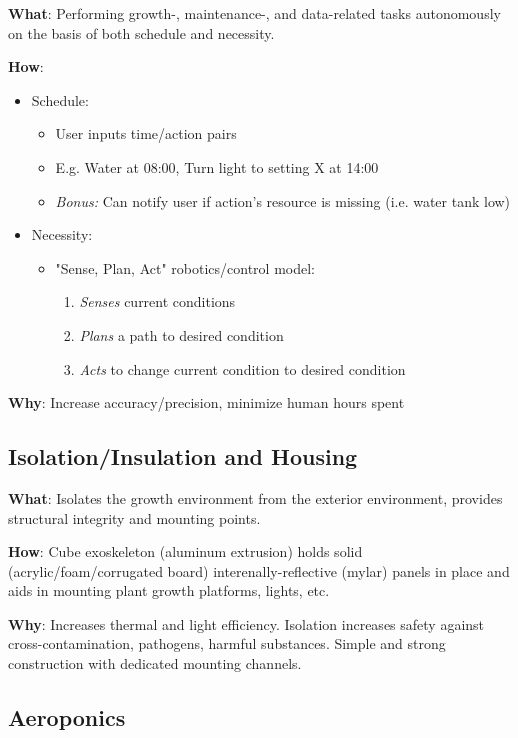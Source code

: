 \documentclass{report}
\begin{document}
\textbf{What}: Performing growth-, maintenance-, and data-related tasks autonomously on the basis of both schedule and necessity.

\textbf{How}:
\begin{itemize}
    \item Schedule:
    \begin{itemize}
        \item User inputs time/action pairs
        \item E.g. Water at 08:00, Turn light to setting X at 14:00
        \item \textit{Bonus:} Can notify user if action's resource is missing (i.e. water tank low)
    \end{itemize}
    \item Necessity:
    \begin{itemize}
        \item "Sense, Plan, Act" robotics/control model:
        \begin{enumerate}
            \item \textit{Senses} current conditions
            \item \textit{Plans} a path to desired condition
            \item \textit{Acts} to change current condition to desired condition
        \end{enumerate}
    \end{itemize}
\end{itemize}
\textbf{Why}: Increase accuracy/precision, minimize human hours spent

\subsection{Isolation/Insulation and Housing}
\label{sec:isolationinsulation}

\textbf{What}: Isolates the growth environment from the exterior environment, provides structural integrity and mounting points.

\textbf{How}: Cube exoskeleton (aluminum extrusion) holds solid (acrylic/foam/corrugated board) interenally-reflective (mylar) panels in place and aids in mounting plant growth platforms, lights, etc.

\textbf{Why}: Increases thermal and light efficiency. Isolation increases safety against cross-contamination, pathogens, harmful substances. Simple and strong construction with dedicated mounting channels.

\subsection{Aeroponics}
\label{sec:aeroponics}
\end{document}
